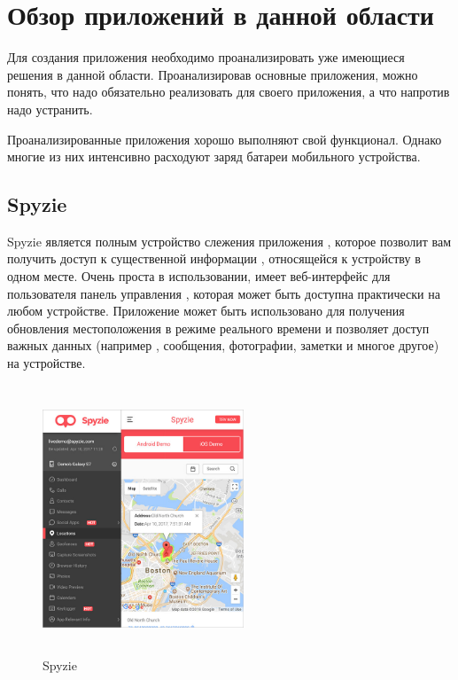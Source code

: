 \documentclass[a4paper,12pt]{article}
\begin{document}

\pagebreak


\section{Обзор приложений в данной области}
Для создания приложения необходимо проанализировать уже имеющиеся решения
в данной области. Проанализировав основные приложения, можно понять, что
надо обязательно реализовать для своего приложения, а что напротив надо
устранить.

Проанализированные приложения хорошо выполняют свой функционал. Однако многие
из них интенсивно расходуют заряд батареи мобильного устройства.
\subsection{Spyzie}

Spyzie является полным устройство слежения приложения ,
 которое позволит вам получить доступ к существенной информации , 
 относящейся к устройству в одном месте. Очень проста в использовании, 
 имеет веб-интерфейс для пользователя панель управления , которая может быть 
 доступна практически на любом устройстве. Приложение может быть использовано для 
 получения обновления местоположения в режиме реального времени и 
 позволяет доступ важных данных (например , сообщения, фотографии, заметки и многое другое) на устройстве\cite{review5}.
 \begin{figure}[H]
 	\centering
 	\includegraphics[width=6cm,height=8cm]{images/spy-location.jpg}
 	\caption{Spyzie}
 	\label{fig:card}
 \end{figure}
\end{document}
